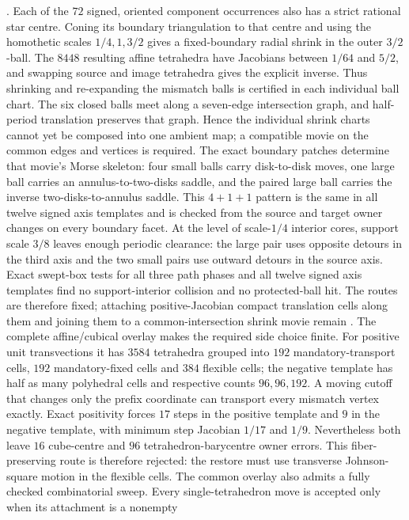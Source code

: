 \Open.
Each of the $72$ signed, oriented component occurrences also has a strict
rational star centre.  Coning its boundary triangulation to that centre and
using the homothetic scales $1/4,1,3/2$ gives a fixed-boundary radial shrink in
the outer $3/2$-ball.  The $8448$ resulting affine tetrahedra have Jacobians
between $1/64$ and $5/2$, and swapping source and image tetrahedra gives the
explicit inverse.  Thus shrinking and re-expanding the mismatch balls is
certified in each individual ball chart.  The six closed balls meet along a
seven-edge intersection graph, and half-period translation preserves that
graph.  Hence the individual shrink charts cannot yet be composed into one
ambient map; a compatible movie on the common edges and vertices is required.
The exact boundary patches determine that movie's Morse skeleton: four small
balls carry disk-to-disk moves, one large ball carries an
annulus-to-two-disks saddle, and the paired large ball carries the inverse
two-disks-to-annulus saddle.  This $4+1+1$ pattern is the same in all twelve
signed axis templates and is checked from the source and target owner changes
on every boundary facet.
At the level of scale-$1/4$ interior cores, support scale $3/8$ leaves
enough periodic clearance: the large pair uses opposite detours in the third
axis and the two small pairs use outward detours in the source axis.  Exact
swept-box tests for all three path phases and all twelve signed axis templates
find no support-interior collision and no protected-ball hit.  The routes are
therefore fixed; attaching positive-Jacobian compact translation cells along
them and joining them to a common-intersection shrink movie remain \Open.
The complete affine/cubical overlay makes the required side choice finite.
For positive unit transvections it has $3584$ tetrahedra grouped into $192$
mandatory-transport cells, $192$ mandatory-fixed cells and $384$ flexible
cells; the negative template has half as many polyhedral cells and respective
counts $96,96,192$.  A moving cutoff that changes only the prefix coordinate
can transport every mismatch vertex exactly.  Exact positivity forces $17$
steps in the positive template and $9$ in the negative template, with minimum
step Jacobian $1/17$ and $1/9$.  Nevertheless both leave $16$ cube-centre and
$96$ tetrahedron-barycentre owner errors.  This fiber-preserving route is
therefore rejected: the restore must use transverse Johnson-square motion in
the flexible cells.
The common overlay also admits a fully checked combinatorial sweep.  Every
single-tetrahedron move is accepted only when its attachment is a nonempty
